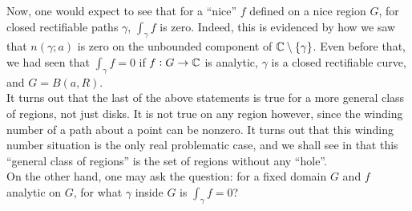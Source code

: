 	Now, one would expect to see that for a ``nice'' $f$ defined on a nice region $G$, for closed rectifiable paths $\gamma$, $\int_\gamma f$ is zero. Indeed, this is evidenced by how we saw that $n(\gamma;a)$ is zero on the unbounded component of $\mathbb{C}\setminus\{\gamma\}$. Even before that, we had seen that $\int_\gamma f = 0$ if $f : G \to \mathbb{C}$ is analytic, $\gamma$ is a closed rectifiable curve, and $G = B(a,R)$.\\
	It turns out that the last of the above statements is true for a more general class of regions, not just disks. It is not true on any region however, since the winding number of a path about a point can be nonzero. It turns out that this winding number situation is the only real problematic case, and we shall see in  that this ``general class of regions'' is the set of regions without any ``hole''.\\
	On the other hand, one may ask the question: for a fixed domain $G$ and $f$ analytic on $G$, for what $\gamma$ inside $G$ is $\int_\gamma f = 0$?

